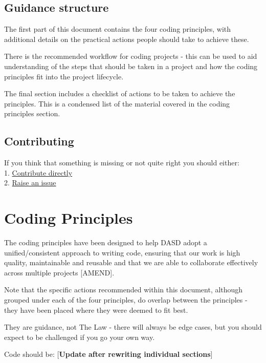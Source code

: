 \documentclass[]{book}
\begin{document}
\hypertarget{structure}{%
\section{Guidance structure}\label{structure}}

The first part of this document contains the four coding principles, with additional details on the practical actions people should take to achieve these.

There is the recommended workflow for coding projects - this can be used to aid understanding of the steps that should be taken in a project and how the coding principles fit into the project lifecycle.

The final section includes a checklist of actions to be taken to achieve the principles. This is a condensed list of the material covered in the coding principles section.

\hypertarget{contributing}{%
\section{Contributing}\label{contributing}}

If you think that something is missing or not quite right you should either:\\
1. \protect\hyperlink{versioncontrol}{Contribute directly}\\
2. \href{https://github.com/moj-analytical-services/our-coding-standards/issues}{Raise an issue}

\hypertarget{principles}{%
\chapter{Coding Principles}\label{principles}}

The coding principles have been designed to help DASD adopt a unified/consistent approach to writing code, ensuring that our work is high quality, maintainable and reusable and that we are able to collaborate effectively across multiple projects {[}AMEND{]}.

Note that the specific actions recommended within this document, although grouped under each of the four principles, do overlap between the principles - they have been placed where they were deemed to fit best.

They are guidance, not The Law - there will always be edge cases, but you should expect to be challenged if you go your own way.

Code should be:
{[}\textbf{Update after rewriting individual sections}{]}
\end{document}
